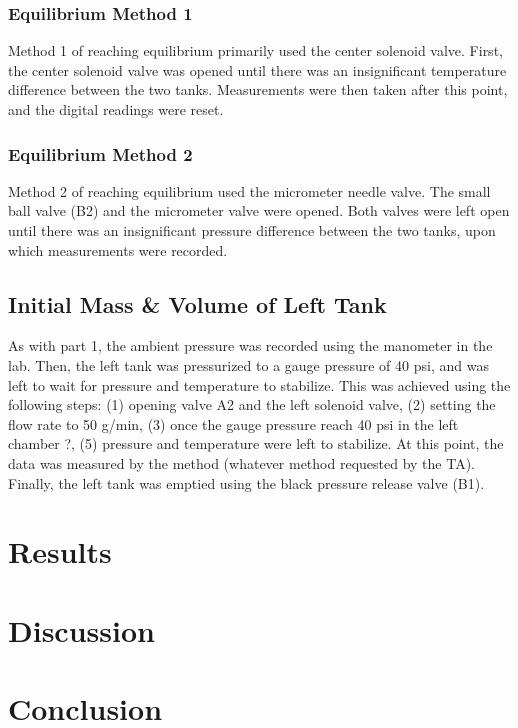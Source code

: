 \documentclass{article} %
\begin{document}
\begin{multicols}{2}
\subsubsection{Equilibrium Method 1}

Method 1 of reaching equilibrium primarily used the center solenoid valve.
First, the center solenoid valve was opened until there was an insignificant temperature difference between the two tanks.
Measurements were then taken after this point, and the digital readings were reset.

\subsubsection{Equilibrium Method 2}

Method 2 of reaching equilibrium used the micrometer needle valve.
The small ball valve (B2) and the micrometer valve were opened.
Both valves were left open until there was an insignificant pressure difference between the two tanks, upon which measurements were recorded.

\subsection{Initial Mass \& Volume of Left Tank}
\label{methods_initial_mass_volume_left_tank}

As with part 1, the ambient pressure was recorded using the manometer in the lab.
Then, the left tank was pressurized to a gauge pressure of 40 psi, and was left to wait for pressure and temperature to stabilize.
This was achieved using the following steps:
(1) opening valve A2 and the left solenoid valve, (2) setting the flow rate to 50 g/min, (3) once the gauge pressure reach 40 psi in the left chamber ?, (5) pressure and temperature were left to stabilize.
At this point, the data was measured by the method (whatever method requested by the TA).
Finally, the left tank was emptied using the black pressure release valve (B1).

\section{Results}
\label{results}

\section{Discussion}
\label{discussion}

\section{Conclusion}
\label{conclusion}

\label{last_page}

\newpage



\end{multicols}
\end{document}
